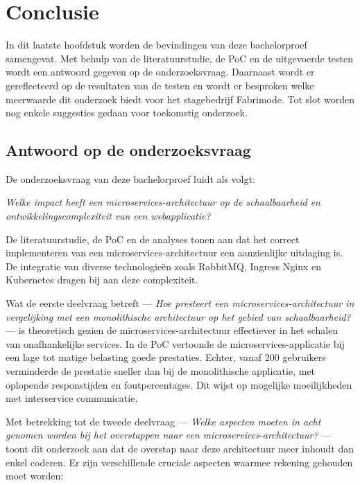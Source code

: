 
\chapter{Conclusie}%
\label{ch:conclusie}

In dit laatste hoofdstuk worden de bevindingen van deze bachelorproef samengevat. Met behulp van de literatuurstudie, de PoC en de uitgevoerde testen wordt een antwoord gegeven op de onderzoeksvraag. Daarnaast wordt er gereflecteerd op de resultaten van de testen en wordt er besproken welke meerwaarde dit onderzoek biedt voor het stagebedrijf Fabrimode. Tot slot worden nog enkele suggesties gedaan voor toekomstig onderzoek.

\section{Antwoord op de onderzoeksvraag}

De onderzoeksvraag van deze bachelorproef luidt als volgt:

\textit{Welke impact heeft een microservices-architectuur op de schaalbaarheid en ontwikkelingscomplexiteit van een webapplicatie?}\newline

De literatuurstudie, de PoC en de analyses tonen aan dat het correct implementeren van een microservices-architectuur een aanzienlijke uitdaging is. De integratie van diverse technologieën zoals RabbitMQ, Ingress Nginx en Kubernetes dragen bij aan deze complexiteit.

Wat de eerste deelvraag betreft — \textit{Hoe presteert een microservices-architectuur in vergelijking met een monolithische architectuur op het gebied van schaalbaarheid?} — is theoretisch gezien de microservices-architectuur effectiever in het schalen van onafhankelijke services. In de PoC vertoonde de microservices-applicatie bij een lage tot matige belasting goede prestaties. Echter, vanaf 200 gebruikers verminderde de prestatie sneller dan bij de monolithische applicatie, met oplopende responstijden en foutpercentages. Dit wijst op mogelijke moeilijkheden met interservice communicatie.

Met betrekking tot de tweede deelvraag — \textit{Welke aspecten moeten in acht genomen worden bij het overstappen naar een microservices-architectuur?} — toont dit onderzoek aan dat de overstap naar deze architectuur meer inhoudt dan enkel coderen. Er zijn verschillende cruciale aspecten waarmee rekening gehouden moet worden:

